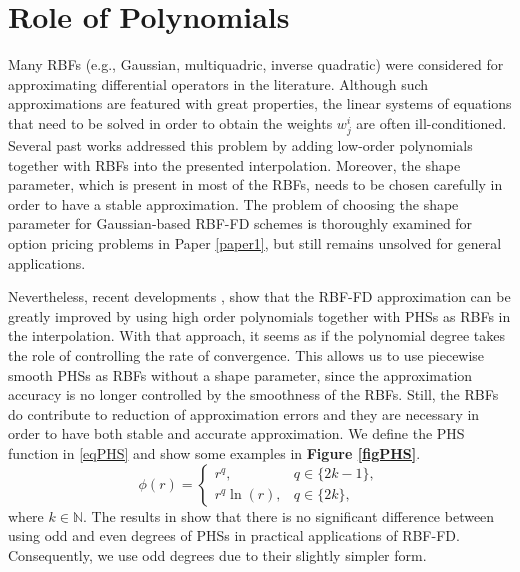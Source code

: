 \documentclass{UUThesisTemplate}
\begin{document}
\section{Role of Polynomials}
Many RBFs (e.g., Gaussian, multiquadric, inverse quadratic) were considered for approximating differential operators in the literature. Although such approximations are featured with great properties, the linear systems of equations that need to be solved in order to obtain the weights $w_j^i$ are often ill-conditioned. Several past works \cite{davydov2011adaptive, fornberg2011stabilization, flyer2012guide, larsson2013stable, fornberg2013stable, flyer2016enhancing} addressed this problem by adding low-order polynomials together with RBFs into the presented interpolation. Moreover, the shape parameter, which is present in most of the RBFs, needs to be chosen carefully in order to have a stable approximation. The problem of choosing the shape parameter for Gaussian-based RBF-FD schemes is thoroughly examined for option pricing problems in Paper \ref{paper1}, but still remains unsolved for general applications.
\par
Nevertheless, recent developments \cite{bayona2017role, flyer2016on}, show that the RBF-FD approximation can be greatly improved by using high order polynomials together with PHSs as RBFs in the interpolation. With that approach, it seems as if the polynomial degree takes the role of controlling the rate of convergence. This allows us to use piecewise smooth PHSs as RBFs without a shape parameter, since the approximation accuracy is no longer controlled by the smoothness of the RBFs. Still, the RBFs do contribute to reduction of approximation errors and they are necessary in order to have both stable and accurate approximation. We define the PHS function in \eqref{eqPHS} and show some examples in \textbf{Figure \ref{figPHS}}.%
\begin{equation}
\label{eqPHS}
\phi(r) =  
	\begin{cases}
		r^q, & q\in\{2k-1\}, \\
		r^q \ln(r), & q\in\{2k\},
	\end{cases}
\end{equation}
where $k \in \mathbb{N}$. The results in \cite{flyer2016on} show that there is no significant difference between using odd and even degrees of PHSs in practical applications of RBF-FD. Consequently, we use odd degrees due to their slightly simpler form.%
%
\end{document}
